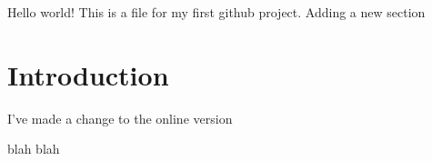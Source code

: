 \documentclass{article}
\begin{document}
Hello world! This is a file for my first github project. Adding a new section
\section{Introduction}

I've made a change to the online version

blah blah
\end{document}
